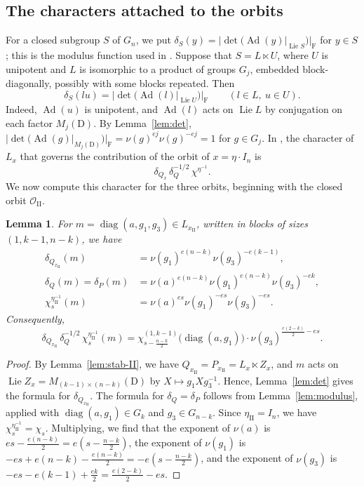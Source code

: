 \documentclass[11pt]{amsart}
\numberwithin{equation}{section}
\theoremstyle{plain}
\newtheorem{lemma}[theorem]{Lemma}
\theoremstyle{definition}
\theoremstyle{remark}
\DeclareMathOperator{\Lie}{Lie}
\DeclareMathOperator{\diag}{diag}
\DeclareMathOperator{\Ad}{Ad}
\newcommand{\OII}{\mathcal{O}_{\mathrm{II}}}
\begin{document}
\subsection{The characters attached to the orbits}\label{ss:orbit-characters}

For a closed subgroup $S$ of $G_n$, we put $\delta_S(y)=|\det(\Ad(y)|_{\Lie S})|_{\mathrm{F}}$ for $y\in S$; this is the modulus function used in \cite{Off17}. Suppose that $S=L\ltimes U$, where $U$ is unipotent and $L$ is isomorphic to a product of groups $G_j$, embedded block-diagonally, possibly with some blocks repeated. Then
$$
\delta_S(lu)=|\det(\Ad(l)|_{\Lie U})|_{\mathrm{F}}\qquad(l\in L,\ u\in U).
$$
Indeed, $\Ad(u)$ is unipotent, and $\Ad(l)$ acts on $\Lie L$ by conjugation on each factor $M_j(\mathrm{D})$. By Lemma~\ref{lem:det}, $|\det(\Ad(g)|_{M_j(\mathrm{D})})|_{\mathrm{F}}=\nu(g)^{ej}\nu(g)^{-ej}=1$ for $g\in G_j$. In \cite[Proposition 4.1]{Off17}, the character of $L_x$ that governs the contribution of the orbit of $x=\eta\cdot I_n$ is
$$
\delta_{Q_x}\,\delta_Q^{-1/2}\,\chi^{\eta^{-1}}.
$$
We now compute this character for the three orbits, beginning with the closed orbit $\OII$.

\begin{lemma}\label{lem:char-II}
	For $m=\diag(a,g_1,g_3)\in L_{x_{\mathrm{II}}}$, written in blocks of sizes $(1,k-1,n-k)$, we have
	\begin{align*}
		\delta_{Q_{x_{\mathrm{II}}}}(m)&=\nu(g_1)^{e(n-k)}\nu(g_3)^{-e(k-1)},\\
		\delta_Q(m)=\delta_P(m)&=\nu(a)^{e(n-k)}\nu(g_1)^{e(n-k)}\nu(g_3)^{-ek},\\
		\chi_s^{\eta_{\mathrm{II}}^{-1}}(m)&=\nu(a)^{es}\nu(g_1)^{-es}\nu(g_3)^{-es}.
	\end{align*}
	Consequently,
	$$
	\delta_{Q_{x_{\mathrm{II}}}}\,\delta_Q^{-1/2}\,\chi_s^{\eta_{\mathrm{II}}^{-1}}(m)=\chi^{(1,k-1)}_{s-\frac{n-k}2}\big(\diag(a,g_1)\big)\cdot\nu(g_3)^{\frac{e(2-k)}2-es}.
	$$
\end{lemma}

\begin{proof}
	By Lemma~\ref{lem:stab-II}, we have $Q_{x_{\mathrm{II}}}=P_{x_{\mathrm{II}}}=L_x\ltimes Z_x$, and $m$ acts on $\Lie Z_x=M_{(k-1)\times(n-k)}(\mathrm{D})$ by $X\mapsto g_1Xg_3^{-1}$. Hence, Lemma~\ref{lem:det} gives the formula for $\delta_{Q_{x_{\mathrm{II}}}}$. The formula for $\delta_Q=\delta_P$ follows from Lemma~\ref{lem:modulus}, applied with $\diag(a,g_1)\in G_k$ and $g_3\in G_{n-k}$. Since $\eta_{\mathrm{II}}=I_n$, we have $\chi_s^{\eta_{\mathrm{II}}^{-1}}=\chi_s$. Multiplying, we find that the exponent of $\nu(a)$ is $es-\frac{e(n-k)}2=e(s-\frac{n-k}2)$, the exponent of $\nu(g_1)$ is $-es+e(n-k)-\frac{e(n-k)}2=-e(s-\frac{n-k}2)$, and the exponent of $\nu(g_3)$ is $-es-e(k-1)+\frac{ek}2=\frac{e(2-k)}2-es$.
\end{proof}
\end{document}
